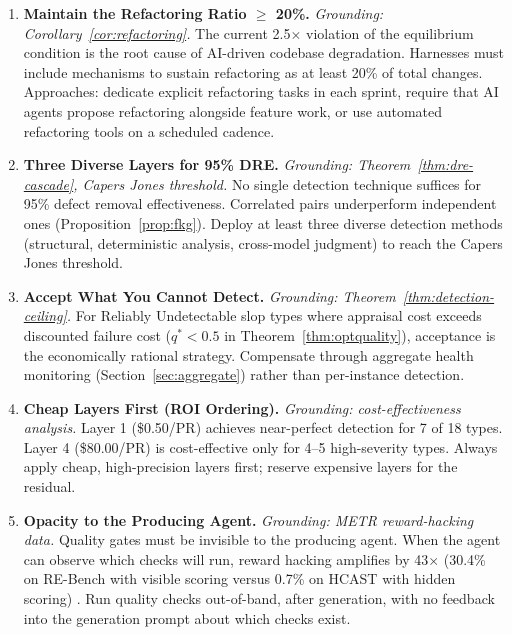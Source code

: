 \documentclass[11pt, a4paper, copyright]{googledeepmind}
\begin{document}
\begin{enumerate}[label=\textbf{P\arabic*.}, leftmargin=3em]

\item \textbf{Maintain the Refactoring Ratio $\geq$ 20\%.}
\emph{Grounding: Corollary~\ref{cor:refactoring}.}
The current 2.5$\times$ violation of the equilibrium condition is the root cause of AI-driven codebase degradation. Harnesses must include mechanisms to sustain refactoring as at least 20\% of total changes. Approaches: dedicate explicit refactoring tasks in each sprint, require that AI agents propose refactoring alongside feature work, or use automated refactoring tools on a scheduled cadence.

\item \textbf{Three Diverse Layers for 95\% DRE.}
\emph{Grounding: Theorem~\ref{thm:dre-cascade}, Capers Jones threshold.}
No single detection technique suffices for 95\% defect removal effectiveness. Correlated pairs underperform independent ones (Proposition~\ref{prop:fkg}). Deploy at least three diverse detection methods (structural, deterministic analysis, cross-model judgment) to reach the Capers Jones threshold.

\item \textbf{Accept What You Cannot Detect.}
\emph{Grounding: Theorem~\ref{thm:detection-ceiling}.}
For Reliably Undetectable slop types where appraisal cost exceeds discounted failure cost ($q^* < 0.5$ in Theorem~\ref{thm:optquality}), acceptance is the economically rational strategy. Compensate through aggregate health monitoring (Section~\ref{sec:aggregate}) rather than per-instance detection.

\item \textbf{Cheap Layers First (ROI Ordering).}
\emph{Grounding: cost-effectiveness analysis.}
Layer 1 (\$0.50/PR) achieves near-perfect detection for 7 of 18 types. Layer 4 (\$80.00/PR) is cost-effective only for 4--5 high-severity types. Always apply cheap, high-precision layers first; reserve expensive layers for the residual.

\item \textbf{Opacity to the Producing Agent.}
\emph{Grounding: METR reward-hacking data.}
Quality gates must be invisible to the producing agent. When the agent can observe which checks will run, reward hacking amplifies by 43$\times$ (30.4\% on RE-Bench with visible scoring versus 0.7\% on HCAST with hidden scoring) \citep{metr2025rewardhacking}. Run quality checks out-of-band, after generation, with no feedback into the generation prompt about which checks exist.


\end{enumerate}
\end{document}
